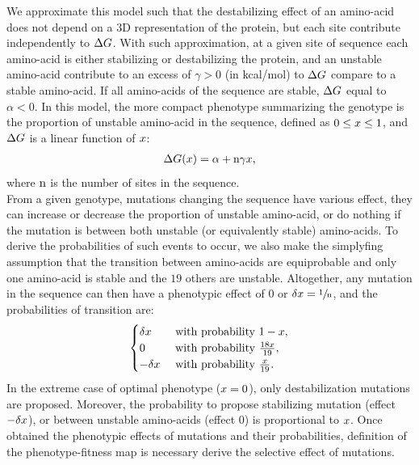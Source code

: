 \documentclass{article}
\begin{document}
We approximate this model such that the destabilizing effect of an amino-acid does not depend on a $3$D representation of the protein, but each site contribute independently to $\Delta G$.
With such approximation, at a given site of sequence each amino-acid is either stabilizing or destabilizing the protein, and an unstable amino-acid contribute to an excess of $\gamma > 0$ (in kcal/mol) to $\Delta G$ compare to a stable amino-acid.
If all amino-acids of the sequence are stable, $\Delta G$ equal to $ \alpha < 0$. 
In this model, the more compact phenotype summarizing the genotype is the proportion of unstable amino-acid in the sequence, defined as $0 \leq x \leq 1$, and $\Delta G$ is a linear function of $x$:
\begin{align}
\Delta G (x) = \alpha + \text{n} \gamma x,
\end{align}
where $\text{n}$ is the number of sites in the sequence. \\

From a given genotype, mutations changing the sequence have various effect, they can increase or decrease the proportion of unstable amino-acid, or do nothing if the mutation is between both unstable (or equivalently stable) amino-acids.
To derive the probabilities of such events to occur, we also make the simplyfing assumption that the transition between amino-acids are equiprobable and only one amino-acid is stable and the $19$ others are unstable.
Altogether, any mutation in the sequence can then have a phenotypic effect of $0$ or $\delta x=\sfrac{1}{\text{n}}$, and the probabilities of transition are:
\begin{gather}
\begin{cases}
\delta x &\text{ with probability } 1-x, \\
0 &\text{ with probability } \frac{18 x }{19}, \\
-\delta x &\text{ with probability } \frac{x}{19}.\\
\end{cases} \label{eq:proba}
\end{gather}
In the extreme case of optimal phenotype ($x = 0$), only destabilization mutations are proposed.
Moreover, the probability to propose stabilizing mutation (effect $-\delta x$), or between unstable amino-acids (effect $0$) is proportional to $x$. 
Once obtained the phenotypic effects of mutations and their probabilities, definition of the phenotype-fitness map is necessary derive the selective effect of mutations.\\
 
\end{document}
